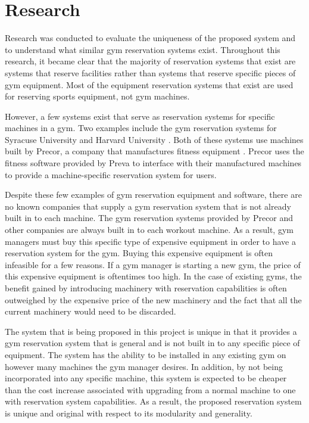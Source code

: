 \documentclass[ppfs.tex]{template/subfiles}
\begin{document}
\section{Research}

Research was conducted to evaluate the uniqueness of the proposed system and to understand what similar gym reservation systems exist. Throughout this research, it became clear that the majority of reservation systems that exist are systems that reserve facilities rather than systems that reserve specific pieces of gym equipment. Most of the equipment reservation systems that exist are used for reserving sports equipment, not gym machines.

However, a few systems exist that serve as reservation systems for specific machines in a gym. Two examples include the gym reservation systems for Syracuse University \cite{Syracuse} and Harvard University \cite{Harvard}. Both of these systems use machines built by Precor, a company that manufactures fitness equipment \cite{Precor}. Precor uses the fitness software provided by Preva \cite{Preva} to interface with their manufactured machines to provide a machine-specific reservation system for users.

Despite these few examples of gym reservation equipment and software, there are no known companies that supply a gym reservation system that is not already built in to each machine. The gym reservation systems provided by Precor and other companies are always built in to each workout machine. As a result, gym managers must buy this specific type of expensive equipment in order to have a reservation system for the gym. Buying this expensive equipment is often infeasible for a few reasons. If a gym manager is starting a new gym, the price of this expensive equipment is oftentimes too high. In the case of existing gyms, the benefit gained by introducing machinery with reservation capabilities is often outweighed by the expensive price of the new machinery and the fact that all the current machinery would need to be discarded.

The system that is being proposed in this project is unique in that it provides a gym reservation system that is general and is not built in to any specific piece of equipment. The system has the ability to be installed in any existing gym on however many machines the gym manager desires. In addition, by not being incorporated into any specific machine, this system is expected to be cheaper than the cost increase associated with upgrading from a normal machine to one with reservation system capabilities. As a result, the proposed reservation system is unique and original with respect to its modularity and generality.
\end{document}
